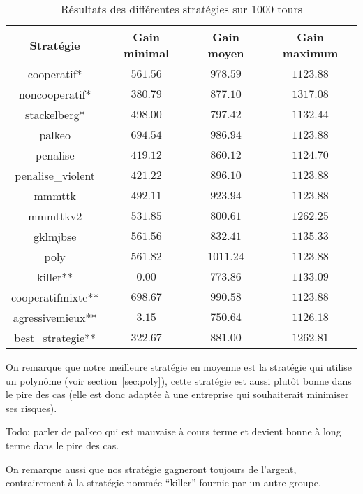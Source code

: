 \documentclass{scrartcl}
\begin{document}
    \begin{table}[f]
      \centering
      \begin{tabular}{|c||c|c|c|}
        \hline
        Stratégie      & Gain minimal & Gain moyen & Gain maximum \\\hline\hline
         cooperatif* & $561.56$ & $978.59$ & $1123.88$ \\\hline
      noncooperatif* & $380.79$ & $877.10$ & $1317.08$ \\\hline
        stackelberg* & $498.00$ & $797.42$ & $1132.44$ \\\hline
              palkeo & $694.54$ & $986.94$ & $1123.88$ \\\hline
            penalise & $419.12$ & $860.12$ & $1124.70$ \\\hline
   penalise\_violent & $421.22$ & $896.10$ & $1123.88$ \\\hline
              mmmttk & $492.11$ & $923.94$ & $1123.88$ \\\hline
            mmmttkv2 & $531.85$ & $800.61$ & $1262.25$ \\\hline
            gklmjbse & $561.56$ & $832.41$ & $1135.33$ \\\hline
                poly & $561.82$ & $1011.24$ & $1123.88$ \\\hline
            killer** & $  0.00$ & $773.86$ & $1133.09$ \\\hline
   cooperatifmixte** & $698.67$ & $990.58$ & $1123.88$ \\\hline
    agressivemieux** & $  3.15$ & $750.64$ & $1126.18$ \\\hline
   best\_strategie** & $322.67$ & $881.00$ & $1262.81$ \\\hline
      \end{tabular}
      \caption{Résultats des différentes stratégies sur 1000 tours}
      \label{table:coop_results2}
    \end{table}

    On remarque que notre meilleure stratégie en moyenne est la stratégie qui
    utilise un polynôme (voir section~\ref{sec:poly}), cette stratégie est
    aussi plutôt bonne dans le pire des cas (elle est donc adaptée à une
    entreprise qui souhaiterait minimiser ses risques).

    Todo: parler de palkeo qui est mauvaise à cours terme et devient bonne à
    long terme dans le pire des cas.

    On remarque aussi que nos stratégie gagneront toujours de l'argent,
    contrairement à la stratégie nommée ``killer'' fournie par un autre groupe.
\end{document}
